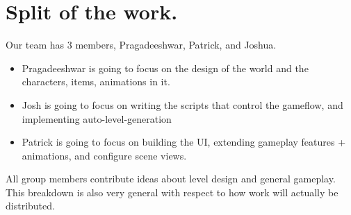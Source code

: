 \documentclass[11pt]{article}
\begin{document}
\section{Split of the work.}
Our team has 3 members, Pragadeeshwar, Patrick, and Joshua.
\begin{itemize}
    \item Pragadeeshwar is going to focus on the design of the world and the characters, items, animations in it. 
    \item Josh is going to focus on writing the scripts that control the gameflow, and implementing auto-level-generation
    \item Patrick is going to focus on building the UI, extending gameplay features + animations, and configure scene views.  
\end{itemize}

All group members contribute ideas about level design and general gameplay. This breakdown is also very general with respect to how work will actually be distributed.
\end{document}
